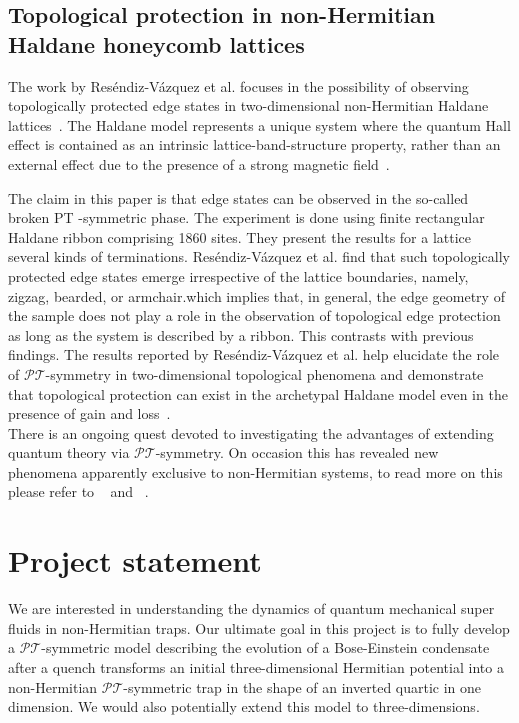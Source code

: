 \documentclass[12pt, a4paper]{report}
\newcommand\PT{\(\mathcal{PT}\)}
\begin{document}
\section{Topological protection in non-Hermitian Haldane honeycomb lattices}\label{TopoProtecc}
The work by Res\'endiz-V\'azquez et al. focuses in the possibility of observing topologically protected
edge states in two-dimensional non-Hermitian Haldane lattices~\cite{Tprotecc}.
The Haldane model represents a unique system where the quantum Hall effect is contained as an intrinsic lattice-band-structure property, rather than an external effect due to the presence of a strong magnetic field~\cite{QuantumAnomalousEffect}. 

The claim in this paper is that edge states can be observed in the so-called broken PT -symmetric phase. 
The experiment is done using finite rectangular Haldane ribbon comprising 1860 sites. They present
the results for a lattice several kinds of terminations. Res\'endiz-V\'azquez et al. find that such topologically protected edge states emerge irrespective of the lattice boundaries, namely, zigzag, bearded, or armchair.which implies that, in general, the edge geometry of the sample does not play a role in the observation of topological edge protection as long as the system is described by a ribbon. This contrasts with previous findings. The results reported by Res\'endiz-V\'azquez et al. help elucidate the role of
\PT-symmetry in two-dimensional topological phenomena and demonstrate that topological protection can exist in the archetypal Haldane model even in the presence of gain and loss~\cite{Tprotecc}.\\

There is an ongoing quest devoted to investigating the advantages of extending quantum theory via \PT-symmetry. On occasion this has revealed new phenomena apparently exclusive to non-Hermitian systems, to read more on this please refer to ~\cite{EigenspaceEPs} and ~\cite{NHQuantumHall}.

\chapter{Project statement}\label{MINE}
We are interested in understanding the dynamics of quantum mechanical super fluids in non-Hermitian traps. Our ultimate goal in this project is to fully develop a \PT-symmetric model describing the evolution of a Bose-Einstein condensate after a quench transforms an initial three-dimensional Hermitian potential into a non-Hermitian \PT-symmetric trap in the shape of an inverted quartic in one dimension. We would also potentially extend this model to three-dimensions. 
\end{document}
